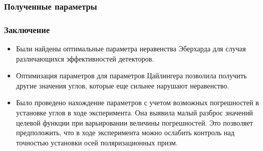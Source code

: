 \documentclass[11pt,pdf,hyperref={unicode}]{beamer}
\theoremstyle{definition}
\begin{document}
\begin{frame}
\frametitle{Полученные параметры}
\begin{figure}[h]
\end{figure}
\end{frame}

\begin{frame}
\frametitle{Заключение}
\begin{itemize}
\item Были найдены оптимальные параметра неравенства Эберхарда для случая различающихся эффективностей детекторов.
\item Оптимизация параметров для параметров Цайлингера позволила получить другие значения углов, которые еще сильнее нарушают неравенство.
\item Было проведено нахождение параметров с учетом возможных погрешностей в установке углов в ходе эксперимента. Она выявила малый разброс значений целевой функции при варьировании величины погрешностей. Это позволяет предположить, что в ходе эксперимента можно ослабить контроль над точностью установки осей поляризационных призм.
\end{itemize}
\end{frame}
\end{document}
